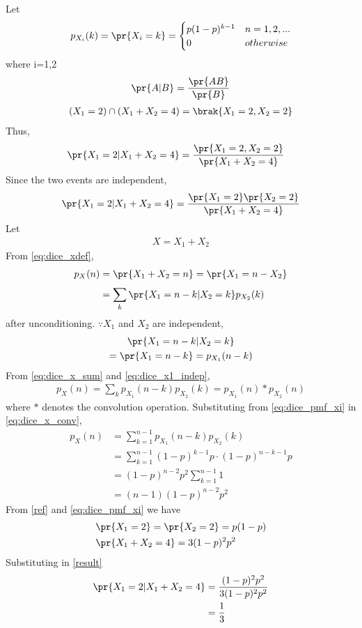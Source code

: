 Let 
\begin{align}
\label{eq:dice_pmf_xi}
p_{X_i}(k)=\pr{X_i=k}=
\begin{cases}
p(1-p)^{k-1} & n=1,2,...
\\
0 & otherwise
\end{cases}
\end{align}
where i=1,2
\begin{align}
\pr{A|B}=\frac{\pr{AB}}{\pr{B}}
\end{align}
\begin{align}
(X_1 = 2) \cap (X_1 + X_2 = 4)=\brak{X_1=2,X_2=2}
\end{align}
Thus,
\begin{align}
  \pr{X_1 = 2 | X_1 + X_2 = 4}&=\frac{\pr{X_1=2,X_2=2}}{\pr{X_1+X_2=4}}
 \end{align}
 Since the two events are independent,
\begin{align}\label{result}
  \pr{X_1 = 2 | X_1 + X_2 = 4}=\frac{\pr{X_1=2}\pr{X_2=2}}{\pr{X_1+X_2=4}}
 \end{align}
Let
\begin{align}\label{eq:dice_xdef}
X=X_1+X_2
\end{align}
From \eqref{eq:dice_xdef},
\begin{align}
p_X(n) &= \pr{X_1 + X_2 = n} = \pr{X_1  = n -X_2}
\\
&= \sum_{k}^{}\pr{X_1  = n -k | X_2 = k}p_{X_2}(k)
\label{eq:dice_x_sum}
\end{align}
after unconditioning.  $\because X_1$ and $X_2$ are independent,
\begin{multline}
\pr{X_1  = n -k | X_2 = k} 
\\
= \pr{X_1  = n -k}
= p_{X_1}(n-k)
\label{eq:dice_x1_indep}
\end{multline}
From \eqref{eq:dice_x_sum} and \eqref{eq:dice_x1_indep},
\begin{align}
p_X(n) = \sum_{k}^{}p_{X_1}(n-k)p_{X_2}(k) = p_{X_1}(n)*p_{X_2}(n)
\label{eq:dice_x_conv}
\end{align}
where $*$ denotes the convolution operation. 
Substituting from \eqref{eq:dice_pmf_xi}
in \eqref{eq:dice_x_conv},
\begin{align}
p_X(n)& = \sum_{k=1}^{n-1}p_{X_1}(n-k)p_{X_2}(k)\\
& = \sum_{k=1}^{n-1} (1-p)^{k-1} p \cdot (1-p)^{n-k-1} p \\ & = (1-p)^{n-2} p^2 \sum_{k=1}^{n-1} 1 \\& = (n-1) (1-p)^{n-2}p^2\label{ref}\end{align}
From \eqref{ref} and \eqref{eq:dice_pmf_xi} we have
\begin{align}
&\pr{X_1=2}=\pr{X_2=2}=p(1-p)\\
&\pr{X_1+X_2=4}=3(1-p)^2p^2
\end{align}
Substituting in \eqref{result}
\begin{align}
 \pr{X_1 = 2 | X_1 + X_2 = 4}
 &=\frac{(1-p)^2p^2}{3(1-p)^2p^2}\\
 &=\frac{1}{3}
\end{align}
